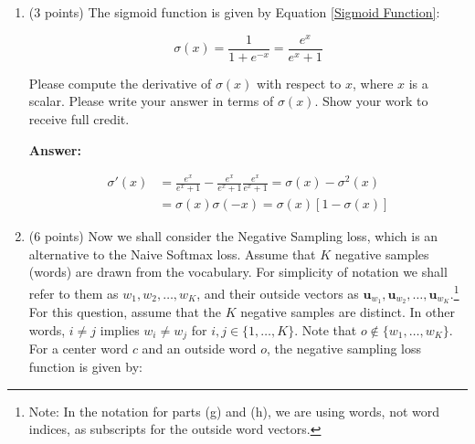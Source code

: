 \documentclass{article}
\newenvironment{answer}{
    {\bf Answer:} \sf \begingroup\color{red}
}{\endgroup}%
\begin{document}
\begin{enumerate}[label=(\alph*)]
Where $x$ is a scalar and $0<\alpha <1$, please compute the derivative of $f(x)$ with respect to $x$. You may ignore the case where the derivative is not defined at 0.\footnote{If you're interested in how to handle the derivative at this point, you can read more about the notion of \hyperref[https://en.wikipedia.org/wiki/Subderivative]{subderivatives}.}

\begin{shaded}
\begin{answer}
\begin{align}
    f'(x) = 
    \begin{cases}
        1,	&	x>0	\\
        \alpha,	&	x<0
    \end{cases}
\end{align}
\end{answer}
\end{shaded}

\item (3 points) The sigmoid function is given by Equation \ref{Sigmoid Function}:

\begin{equation}
    \label{Sigmoid Function}
    \sigma (x) = \frac{1}{1 + e^{-x}} = \frac{e^{x}}{e^{x} + 1}
\end{equation}

Please compute the derivative of $\sigma(x)$ with respect to $x$, where $x$ is a scalar. Please write your answer in terms of $\sigma(x)$. Show your work to receive full credit.

\begin{shaded}
\begin{answer}
\begin{align}
    \sigma'(x) &= \frac{e^{x}}{e^{x} + 1} - \frac{e^x}{e^{x} + 1}\frac{e^{x}}{e^{x} + 1} 
            = \sigma(x) - \sigma^2(x)	\\
            &= \sigma(x)\sigma(-x)
            = \sigma(x)\left[ 1 - \sigma(x) \right]
\end{align}
\end{answer}
\end{shaded}

\item (6 points) Now we shall consider the Negative Sampling loss, which is an alternative to the Naive Softmax loss.  Assume that $K$ negative samples (words) are drawn from the vocabulary. For simplicity of notation we shall refer to them as $w_1, w_2, \dots, w_K$, and their outside vectors as $\bm u_{w_1}, \bm u_{w_2}, \dots, \bm u_{w_K}$.\footnote{Note: In the notation for parts (g) and (h), we are using words, not word indices, as subscripts for the outside word vectors.} For this question, assume that the $K$ negative samples are distinct. In other words, $i\neq j$ implies $w_i\neq w_j$ for $i,j\in\{1,\dots,K\}$.
Note that $o\notin\{w_1, \dots, w_K\}$. 
For a center word $c$ and an outside word $o$, the negative sampling loss function is given by:


\end{enumerate}
\end{document}
